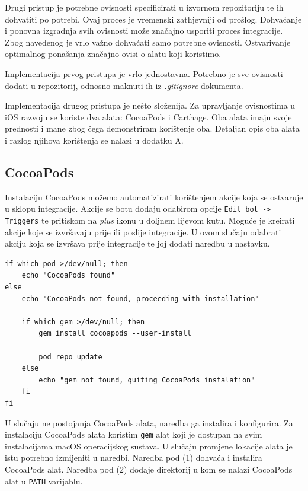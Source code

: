 \documentclass[times, utf8, diplomski, numeric]{fer}
\begin{document}
\begin{appendices}
Drugi pristup je potrebne ovisnosti specificirati u izvornom repozitoriju te ih dohvatiti po potrebi. Ovaj proces je vremenski zathjevniji od prošlog. Dohvaćanje i ponovna izgradnja svih ovisnosti može značajno usporiti proces integracije. Zbog navedenog je vrlo važno dohvaćati samo potrebne ovisnosti. Ostvarivanje optimalnog ponašanja značajno ovisi o alatu koji koristimo.

Implementacija prvog pristupa je vrlo jednostavna. Potrebno je sve ovisnosti dodati u repozitorij, odnosno maknuti ih iz \textit{.gitignore} dokumenta.

Implementacija drugog pristupa je nešto složenija. Za upravljanje ovisnostima u iOS razvoju se koriste dva alata: CocoaPods i Carthage. Oba alata imaju svoje prednosti i mane zbog čega demonstriram korištenje oba. Detaljan opis oba alata i razlog njihova korištenja se nalazi u dodatku A.

\subsection{CocoaPods}

Instalaciju CocoaPods možemo automatizirati korištenjem akcije koja se ostvaruje u sklopu integracije. Akcije se botu dodaju odabirom opcije \verb|Edit bot -> Triggers| te pritiskom na \textit{plus} ikonu u doljnem lijevom kutu. Moguće je kreirati akcije koje se izvršavaju prije ili poslije integracije. U ovom slučaju odabrati akciju koja se izvršava prije integracije te joj dodati naredbu u nastavku.

\begin{verbatim}
if which pod >/dev/null; then
    echo "CocoaPods found"
else
    echo "CocoaPods not found, proceeding with installation"

    if which gem >/dev/null; then
        gem install cocoapods --user-install

        pod repo update
    else
        echo "gem not found, quiting CocoaPods instalation"
    fi
fi
\end{verbatim}

U slučaju ne postojanja CocoaPods alata, naredba ga instalira i konfigurira. Za instalaciju CocoaPods alata koristim \verb|gem| alat koji je dostupan na svim instalacijama macOS operacijskog sustava. U slučaju promjene lokacije alata je istu potrebno izmijeniti u naredbi. Naredba pod (1) dohvaća i instalira CocoaPods alat. Naredba pod (2) dodaje direktorij u kom se nalazi CocoaPods alat u \verb|PATH| varijablu.


\end{appendices}
\end{document}
